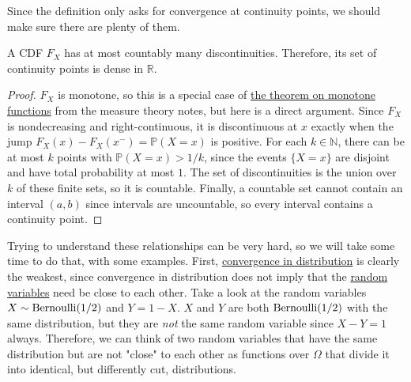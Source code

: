   Since the definition only asks for convergence at continuity points, we should make sure there are plenty of them.

  \begin{lemma}
    \label{thm:continuity-points-of-a-cdf-are-dense}
    A CDF $F_X$ has at most countably many discontinuities. Therefore, its set of continuity points is dense in $\mathbb{R}$.
  \end{lemma}
  \begin{proof}
    $F_X$ is monotone, so this is a special case of \hyperref[mt-thm:monotone-functions-has-at-most-countable]{the theorem on monotone functions} from the measure theory notes, but here is a direct argument. Since $F_X$ is nondecreasing and right-continuous, it is discontinuous at $x$ exactly when the jump $F_X (x) - F_X (x^-) = \mathbb{P}(X = x)$ is positive. For each $k \in \mathbb{N}$, there can be at most $k$ points with $\mathbb{P}(X = x) > 1/k$, since the events $\{X = x\}$ are disjoint and have total probability at most $1$. The set of discontinuities is the union over $k$ of these finite sets, so it is countable. Finally, a countable set cannot contain an interval $(a, b)$ since intervals are uncountable, so every interval contains a continuity point.
  \end{proof}

  Trying to understand these relationships can be very hard, so we will take some time to do that, with some examples. First, \hyperref[def:convergence-in-distribution]{convergence in distribution} is clearly the weakest, since convergence in distribution does not imply that the \hyperref[def:random-variable]{random variables} need be close to each other. Take a look at the random variables $X \sim \operatorname{Bernoulli}(1/2)$ and $Y = 1 - X$. $X$ and $Y$ are both $\operatorname{Bernoulli}(1/2)$ with the same distribution, but they are \textit{not} the same random variable since $X - Y = 1$ always. Therefore, we can think of two random variables that have the same distribution but are not "close" to each other as functions over $\Omega$ that divide it into identical, but differently cut, distributions. 

